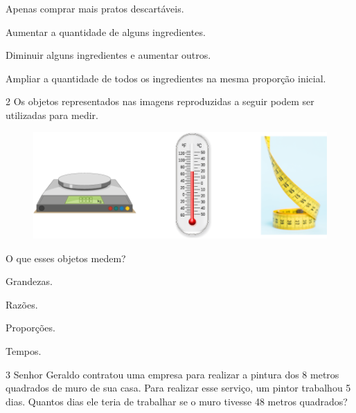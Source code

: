 \begin{escolha}
\item
  Apenas comprar mais pratos descartáveis.
\item
  Aumentar a quantidade de alguns ingredientes.
\item
  Diminuir alguns ingredientes e aumentar outros.
\item
  Ampliar a quantidade de todos os ingredientes na mesma proporção
  inicial.
\end{escolha}


\pagebreak
\num{2} Os objetos representados nas imagens reproduzidas a seguir podem ser utilizadas para medir.

\begin{figure}[htpb!]
\centering
\includegraphics[width=\textwidth]{media/image70.png}
\end{figure}

O que esses objetos medem?

\begin{minipage}{.5\textwidth}
\begin{escolha}
\item
  Grandezas.
\item
  Razões.
\item
  Proporções.
\item
  Tempos.
\end{escolha}
\end{minipage}

\num{3} Senhor Geraldo contratou uma empresa para realizar a pintura dos 8
metros quadrados de muro de sua casa. Para realizar esse serviço, um pintor
trabalhou 5 dias. Quantos dias ele teria de trabalhar se o muro tivesse
48 metros quadrados?

\begin{mdframed}[linewidth=2pt,linecolor=salmao,roundcorner=2pt]
\vspace{2cm}
\end{mdframed}


